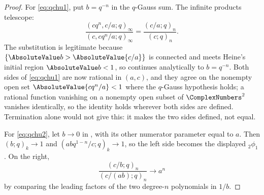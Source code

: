 \documentclass[11pt,a4paper,oneside,openany]{book}
\theoremstyle{definition}
\theoremstyle{remark}
\begin{document}
\begin{proof}
For \eqref{eq:qchu1}, put $b=q^{-n}$ in the $q$-Gauss sum.  The infinite products telescope:
\[
 \frac{(cq^n,c/a;q)_\infty}{(c,cq^n/a;q)_\infty}
 =\frac{(c/a;q)_n}{(c;q)_n}.
\]
The substitution is legitimate because $\{\AbsoluteValue b>\AbsoluteValue{c/a}\}$ is connected and
meets Heine's initial region $\AbsoluteValue b<1$, so  continues
analytically to $b=q^{-n}$.  Both sides of \eqref{eq:qchu1} are now rational
in $(a,c)$, and they agree on the nonempty open set $\AbsoluteValue{cq^n/a}<1$ where the
$q$-Gauss hypothesis holds; a rational function vanishing on a nonempty open
subset of $\ComplexNumbers^2$ vanishes identically, so the identity holds wherever both
sides are defined.  Termination alone would not give this: it makes the two
sides defined, not equal.

For \eqref{eq:qchu2}, let $b\to0$ in , with its other numerator parameter equal to $a$.  Then $(b;q)_k\to1$ and $(abq^{1-n}/c;q)_k\to1$, so the left side becomes the displayed ${}_2\phi_1$.  On the right,
\[
 \frac{(c/b;q)_n}{(c/(ab);q)_n}\longrightarrow a^n
\]
by comparing the leading factors of the two degree-$n$ polynomials in $1/b$.
\end{proof}

\end{document}
